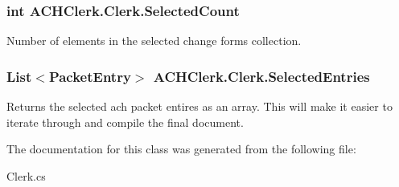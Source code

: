 \hypertarget{class_a_c_h_clerk_1_1_clerk_a030ee3e580ed999b00e4fd4f4988a5a6}{
\subsubsection[{Selected\+Count}]{\setlength{\rightskip}{0pt plus 5cm}int A\+C\+H\+Clerk.\+Clerk.\+Selected\+Count\hspace{0.3cm}{\ttfamily [get]}}}\label{class_a_c_h_clerk_1_1_clerk_a030ee3e580ed999b00e4fd4f4988a5a6}


Number of elements in the selected change forms collection. 

\hypertarget{class_a_c_h_clerk_1_1_clerk_a6008f6df10bc7cfeef39781e346138b9}{
\subsubsection[{Selected\+Entries}]{\setlength{\rightskip}{0pt plus 5cm}List$<${\bf Packet\+Entry}$>$ A\+C\+H\+Clerk.\+Clerk.\+Selected\+Entries\hspace{0.3cm}{\ttfamily [get]}}}\label{class_a_c_h_clerk_1_1_clerk_a6008f6df10bc7cfeef39781e346138b9}


Returns the selected ach packet entires as an array. This will make it easier to iterate through and compile the final document. 



The documentation for this class was generated from the following file\+:\begin{DoxyCompactItemize}
\item 
Clerk.\+cs\end{DoxyCompactItemize}
